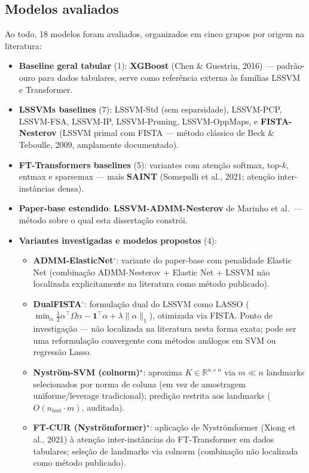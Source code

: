 \documentclass[12pt,a4paper]{article}
\begin{document}
\subsection*{Modelos avaliados}

Ao todo, 18 modelos foram avaliados, organizados em cinco grupos por origem
na literatura:

\begin{itemize}
  \item \textbf{Baseline geral tabular} (1): \textbf{XGBoost} (Chen \& Guestrin, 2016)
        --- padrão-ouro para dados tabulares, serve como referência externa às
        famílias LSSVM e Transformer.
  \item \textbf{LSSVMs baselines} (7): LSSVM-Std (sem esparsidade), LSSVM-PCP,
        LSSVM-FSA, LSSVM-IP, LSSVM-Pruning, LSSVM-OppMaps, e \textbf{FISTA-Nesterov}
        (LSSVM primal com FISTA --- método clássico de Beck \& Teboulle, 2009,
        amplamente documentado).
  \item \textbf{FT-Transformers baselines} (5): variantes com atenção softmax,
        top-$k$, entmax e sparsemax --- mais \textbf{SAINT}
        (Somepalli et al., 2021; atenção inter-instâncias densa).
  \item \textbf{Paper-base estendido}: \textbf{LSSVM-ADMM-Nesterov} de
        Marinho et al.\ --- método sobre o qual esta dissertação constrói.
  \item \textbf{Variantes investigadas e modelos propostos} (4):
  \begin{itemize}
    \item \textbf{ADMM-ElasticNet}$^\circ$: variante do paper-base com penalidade
          Elastic Net (combinação ADMM-Nesterov + Elastic Net + LSSVM não
          localizada explicitamente na literatura como método publicado).
    \item \textbf{DualFISTA}$^\circ$: formulação dual do LSSVM como LASSO
          ($\min_\alpha \frac{1}{2}\alpha^\top\Omega\alpha - \mathbf{1}^\top\alpha + \lambda\|\alpha\|_1$),
          otimizada via FISTA. Ponto de investigação --- não localizada na
          literatura nesta forma exata; pode ser uma reformulação convergente
          com métodos análogos em SVM ou regressão Lasso.
    \item \textbf{Nyström-SVM (colnorm)}$^\star$: aproxima $K \in \mathbb{R}^{n \times n}$
          via $m \ll n$ landmarks selecionados por norma de coluna
          (em vez de amostragem uniforme/leverage tradicional); predição
          restrita aos landmarks ($O(n_\text{test} \cdot m)$, auditada).
    \item \textbf{FT-CUR (Nyströmformer)}$^\star$: aplicação de Nyströmformer
          (Xiong et al., 2021) à atenção inter-instâncias do FT-Transformer
          em dados tabulares; seleção de landmarks via colnorm
          (combinação não localizada como método publicado).
  \end{itemize}
\end{itemize}
\end{document}
